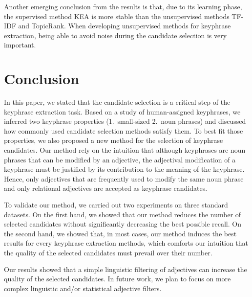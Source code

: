       Another emerging conclusion from the results is that, due to its
      learning phase, the supervised method KEA is more stable than the
      unsupervised methods TF-IDF and TopicRank. When developing unsupervised
      methods for keyphrase extraction, being able to avoid noise during the
      candidate selection is very important.

\section{Conclusion}
\label{sec:conclusion}
  In this paper, we stated that the candidate selection is a critical step of
  the keyphrase extraction task. Based on a study of human-assigned keyphrases,
  we inferred two keyphrase properties (1.~small-sized 2.~noun phrases) and
  discussed how commonly used candidate selection methods satisfy them. To best
  fit those properties, we also proposed a new method for the selection of
  keyphrase candidates. Our method rely on the intuition that although
  keyphrases are noun phrases that can be modified by an adjective, the
  adjectival modification of a keyphrase must be justified by its contribution
  to the meaning of the keyphrase. Hence, only adjectives that are frequently
  used to modify the same noun phrase and only relational adjectives are
  accepted as keyphrase candidates.

  To validate our method, we carried out two experiments on three standard
  datasets. On the first hand, we showed that our method reduces the number of
  selected candidates without significantly decreasing the best possible recall.
  On the second hand, we showed that, in most cases, our method induces the best
  results for every keyphrase extraction methods, which comforts our intuition
  that the quality of the selected candidates must prevail over their number.

  Our results showed that a simple linguistic filtering of adjectives can
  increase the quality of the selected candidates. In future work, we plan to
  focus on more complex linguistic and/or statistical adjective filters.

